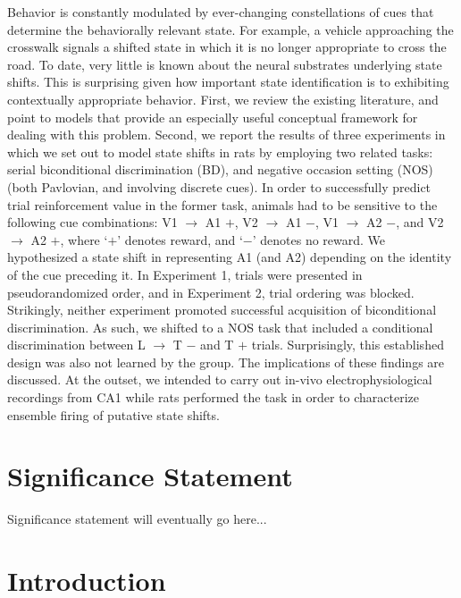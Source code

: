 \documentclass[11pt]{article}
\let\cite=\citep
\begin{document}
Behavior is constantly modulated by ever-changing constellations of cues
that determine the behaviorally relevant state. For example, a vehicle
approaching the crosswalk signals a shifted state in which it is no longer
appropriate to cross the road. To date, very little is known about the neural
substrates underlying state shifts. This is surprising given how important 
state identification is to exhibiting contextually appropriate behavior. First, 
we review the existing literature, and point to models that provide an 
especially useful conceptual framework for dealing with this problem. Second, 
we report the results of three experiments in which we set out to model state 
shifts in rats by employing two related tasks: serial biconditional 
discrimination (BD), and negative occasion setting (NOS) (both Pavlovian, and 
involving discrete cues). In order to successfully predict trial reinforcement 
value in the former task, animals had to be sensitive to the following cue 
combinations: V1 $\rightarrow$ A1 $+$, V2 $\rightarrow$ A1 $-$, V1 $\rightarrow
$ A2 $-$, and V2 $\rightarrow$ A2 $+$, where `$+$' denotes reward, and `$-$' 
denotes no reward. We hypothesized a state shift in representing A1 (and A2) 
depending on the identity of the cue preceding it. In Experiment 1, trials were 
presented in pseudorandomized order, and in Experiment 2, trial ordering was 
blocked. Strikingly, neither experiment promoted successful acquisition of 
biconditional discrimination. As such, we shifted to a NOS task 
\cite{Holland1999} that included a conditional discrimination between L $
\rightarrow$ T $-$ and T $+$ trials. Surprisingly, this established design was 
also not learned by the group. The implications of these findings are 
discussed. At the outset, we intended to carry out in-vivo electrophysiological 
recordings from CA1 while rats performed the task in order to characterize 
ensemble firing of putative state shifts.

\section*{Significance Statement}

Significance statement will eventually go here...

\newpage

\section*{Introduction}
\end{document}
